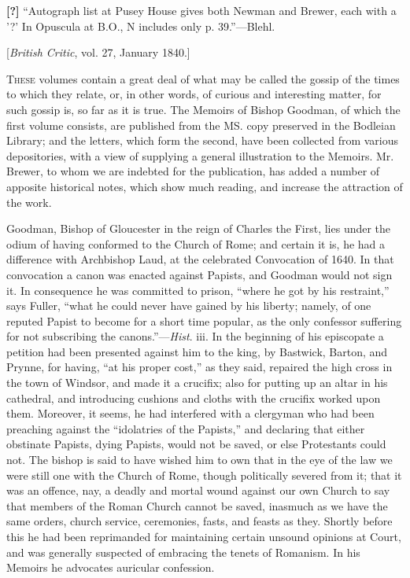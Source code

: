 \textbf{[?]} ``Autograph
list at Pusey House gives both Newman and Brewer, each with a '?' In
Opuscula at B.O., N includes only p. 39.''—Blehl.

[\emph{British Critic}, vol. 27, January 1840.]

T\textsc{hese} volumes contain a
great deal of what may be called the gossip of the times to which they
relate, or, in other words, of curious and interesting matter, for such
gossip is, so far as it is true. The Memoirs of Bishop Goodman, of which
the first volume consists, are published from the MS. copy preserved in
the Bodleian Library; and the letters, which form the second, have been
collected from various depositories, with a view of supplying a general
illustration to the Memoirs. Mr. Brewer, to whom we are indebted for the
publication, has added a number of apposite historical notes, which show
much reading, and increase the attraction of the work.

Goodman, Bishop of Gloucester in the reign of
Charles the First, lies under the odium of having conformed to the
Church of Rome; and certain it is, he had a difference with Archbishop
Laud, at the celebrated Convocation of 1640. In that convocation a canon
was enacted against Papists, and Goodman would not sign it. In
consequence he was committed to prison, ``where he got by his restraint,''
says Fuller, ``what he could never have gained by his liberty; namely, of
one reputed Papist to become for a short time popular, as the only
confessor suffering for not subscribing the canons.''—\emph{Hist}. iii.
In the beginning of his episcopate a petition had been presented against
him to the king, by Bastwick, Barton, and Prynne, for having, ``at his
proper cost,'' as they said, repaired the high cross in the town of
Windsor, and made it a crucifix; also for putting up an altar in his
cathedral, and introducing cushions and cloths with the crucifix worked
upon them. Moreover, it seems, he had interfered with a clergyman who
had been preaching against the ``idolatries of the Papists,'' and
declaring that either obstinate Papists, dying Papists, would not be
saved, or else Protestants could not. The bishop is said to have wished
him to own that in the eye of the law we were still one with the Church
of Rome, though politically severed from it; that it was an offence,
nay, a deadly and mortal wound against our own Church to say that
members of the Roman Church cannot be saved, inasmuch as we have the
same orders, church service, ceremonies, fasts, and feasts as they.
Shortly before this he had been reprimanded for maintaining certain
unsound opinions at Court, and was generally suspected of embracing the
tenets of Romanism. In his Memoirs he advocates auricular confession.

